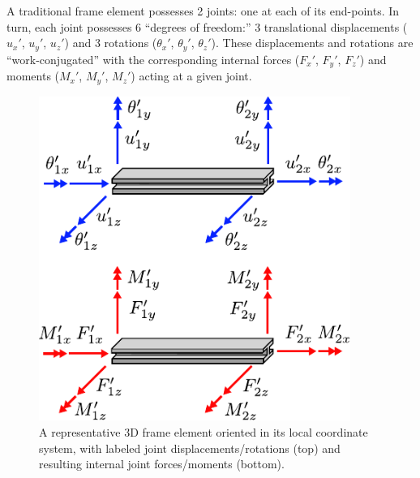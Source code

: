 \documentclass[12pt,a4paper,article]{memoir} %
\begin{document}
A traditional frame element possesses 2 joints: one at each of its end-points. In turn, each joint possesses 6 ``degrees of freedom:'' 3 translational displacements ($u_x'$, $u_y'$, $u_z'$) and 3 rotations ($\theta_x'$, $\theta_y'$, $\theta_z'$). These displacements and rotations are ``work-conjugated'' with the corresponding internal forces ($F_x'$, $F_y'$, $F_z'$) and moments ($M_x'$, $M_y'$, $M_z'$) acting at a given joint. 
\begin{figure}
	\centering
	\includegraphics[width = 4.0in]{figures/frame.pdf}
	\caption{A representative 3D frame element oriented in its local coordinate system, with labeled joint displacements/rotations (top) and resulting internal joint forces/moments (bottom).}
	\label{fig:frame}
\end{figure}
\end{document}
